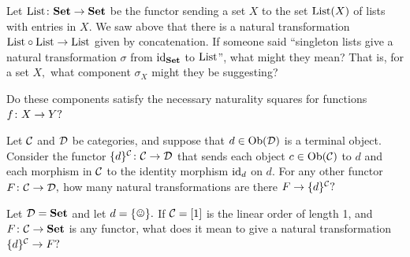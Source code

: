 \documentclass[CT4S-EN-RU]{subfiles}
\begin{document}
\begin{exerciseRUS}
\end{exerciseRUS}

\begin{exerciseENG}
Let $\textnormal{List}\colon{\mathbf{Set}}\rightarrow{\mathbf{Set}}$ be the functor sending a set $X$ to the set $\textnormal{List}(X)$ of lists with entries in $X.$ We saw above that there is a natural transformation $\textnormal{List}\circ\textnormal{List}\rightarrow\textnormal{List}$ given by concatenation.
\sexc If someone said “singleton lists give a natural transformation $\sigma$ from $\textnormal{id}_{\mathbf{Set}}$ to $\textnormal{List}$”, what might they mean? That is, for a set $X,$ what component $\sigma_X$ might they be suggesting?
\item Do these components satisfy the necessary naturality squares for functions $f\colon X\rightarrow Y?$
\endsexc
\end{exerciseENG}

\begin{exerciseRUS}
\end{exerciseRUS}

\begin{exerciseENG}
Let $\mathcal{C}$ and $\mathcal{D}$ be categories, and suppose that $d\in\textnormal{Ob}(\mathcal{D})$ is a terminal object. Consider the functor $\{d\}^\mathcal{C}\colon\mathcal{C}\rightarrow\mathcal{D}$ that sends each object $c\in\textnormal{Ob}(\mathcal{C})$ to $d$ and each morphism in $\mathcal{C}$ to the identity morphism $\textnormal{id}_d$ on $d.$ 
\sexc For any other functor $F\colon\mathcal{C}\rightarrow\mathcal{D},$ how many natural transformations are there $F\rightarrow\{d\}^\mathcal{C}?$ 
\item Let $\mathcal{D}={\mathbf{Set}}$ and let $d=\singleton.$ If $\mathcal{C}=[1]$ is the linear order of length 1, and $F\colon\mathcal{C}\rightarrow{\mathbf{Set}}$ is any functor, what does it mean to give a natural transformation $\{d\}^\mathcal{C}\rightarrow F?$
\endsexc
\end{exerciseENG}

\begin{exerciseRUS}
\end{exerciseRUS}
\end{document}
